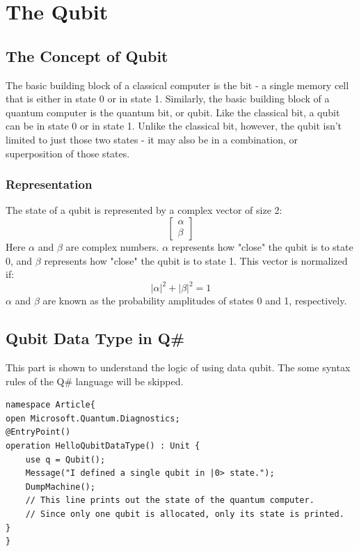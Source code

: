 \documentclass{article}
\begin{document}
\vspace{3cm}

\section{The Qubit}
\subsection{The Concept of Qubit}
The basic building block of a classical computer is the bit - a single memory cell that is either in state 0 or in state 1. Similarly, the basic building block of a quantum computer is the quantum bit, or qubit. Like the classical bit, a qubit can be in state 0 or in state 1. Unlike the classical bit, however, the qubit isn't limited to just those two states - it may also be in a combination, or superposition of those states.
\subsubsection{Representation}
The state of a qubit is represented by a complex vector of size 2:
$$\begin{bmatrix} \alpha \\ \beta \end{bmatrix}$$
Here $\alpha$ and $\beta$ are complex numbers. $\alpha$ represents how "close" the qubit is to state 0, and $\beta$ represents how "close" the qubit is to state 1. This vector is normalized if: $$|\alpha|^2 + |\beta|^2 = 1$$
 $\alpha$ and $\beta$ are known as the probability amplitudes of states 0 and 1, respectively.

\vspace{2cm}
 
 \subsection{Qubit Data Type in Q\#}
 This part is shown to understand the logic of using data qubit. The some syntax rules of the Q\# language will be skipped.
 \begin{verbatim}
namespace Article{
open Microsoft.Quantum.Diagnostics;
@EntryPoint()
operation HelloQubitDataType() : Unit {
    use q = Qubit();
    Message("I defined a single qubit in |0> state.");
    DumpMachine();
    // This line prints out the state of the quantum computer.
    // Since only one qubit is allocated, only its state is printed.
}
}
 \end{verbatim}
\vspace{3cm}
\end{document}
